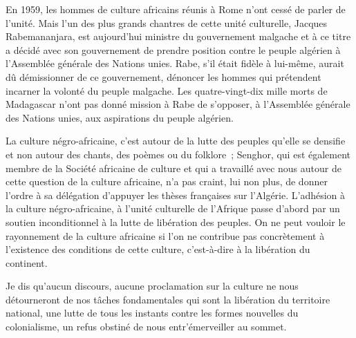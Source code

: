 \documentclass[french,twoside]{book} %
\begin{document}
\bigbreak
\noindent En 1959, les hommes de culture africains réunis à Rome n’ont cessé de parler de l’unité. Mais l’un des plus grands chantres de cette unité culturelle, Jacques Rabemananjara, est aujourd’hui ministre du gouvernement malgache et à ce titre a décidé avec son gouvernement de prendre position contre le peuple algérien à l’Assemblée générale des Nations unies. Rabe, s’il était fidèle à lui-même, aurait dû démissionner de ce gouvernement, dénoncer les hommes qui prétendent incarner la volonté du peuple malgache. Les quatre-vingt-dix mille morts de Madagascar n’ont pas donné mission à Rabe de s’opposer, à l’Assemblée générale des Nations unies, aux aspirations du peuple algérien.\par
\bigbreak
\noindent La culture négro-africaine, c’est autour de la lutte des peuples qu’elle se densifie et non autour des chants, des poèmes ou du folklore ; Senghor, qui est également membre de la Société africaine de culture et qui a travaillé avec nous autour de cette question de la culture africaine, n’a pas craint, lui non plus, de donner l’ordre à sa délégation d’appuyer les thèses françaises sur l’Algérie. L’adhésion à la culture négro-africaine, à l’unité culturelle de l’Afrique passe d’abord par un soutien inconditionnel à la lutte de libération des peuples. On ne peut vouloir le rayonnement de la culture africaine si l’on ne contribue pas concrètement à l’existence des conditions de cette culture, c’est-à-dire à la libération du continent.\par
\bigbreak
\noindent Je dis qu’aucun discours, aucune proclamation sur la culture ne nous détourneront de nos tâches fondamentales qui sont la libération du territoire national, une lutte de tous les instants contre les formes nouvelles du colonialisme, un refus obstiné de nous entr’émerveiller au sommet.\par
\end{document}
